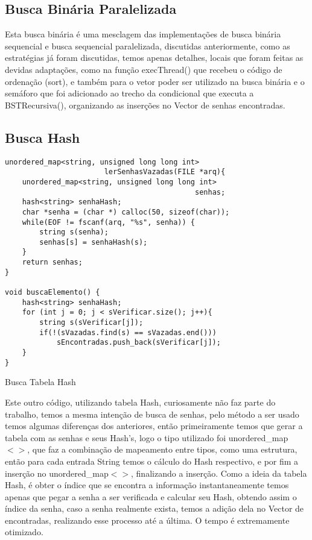 \documentclass[10pt,journal,compsoc]{IEEEtran}
\begin{document}
\subsection{Busca Binária Paralelizada}
	
	Esta busca binária é uma mesclagem das implementações de busca binária sequencial e busca sequencial paralelizada, discutidas anteriormente, como as estratégias já foram discutidas, temos apenas detalhes, locais que foram feitas as devidas adaptações, como na função execThread() que recebeu o código de ordenação (sort), e também para o vetor poder ser utilizado na busca binária e o semáforo que foi adicionado ao trecho da condicional que executa a BSTRecursiva(), organizando as inserções no Vector de senhas encontradas.


\subsection{Busca Hash}
	
\begin{listing}[ht]
\begin{verbatim}
unordered_map<string, unsigned long long int>
                       lerSenhasVazadas(FILE *arq){
    unordered_map<string, unsigned long long int> 
                                            senhas;
    hash<string> senhaHash;
    char *senha = (char *) calloc(50, sizeof(char));
    while(EOF != fscanf(arq, "%s", senha)) {
        string s(senha);
        senhas[s] = senhaHash(s);
    }
    return senhas;
}

void buscaElemento() {
    hash<string> senhaHash;
    for (int j = 0; j < sVerificar.size(); j++){
        string s(sVerificar[j]);
        if(!(sVazadas.find(s) == sVazadas.end()))
            sEncontradas.push_back(sVerificar[j]);
    }
}
\end{verbatim}
\caption{Busca Tabela Hash}
\label{listing:5}
\end{listing}
	
	Este outro código, utilizando tabela Hash, curiosamente não faz parte do trabalho, temos a mesma intenção de busca de senhas, pelo método a ser usado temos algumas diferenças dos anteriores, então primeiramente temos que gerar a tabela com as senhas e seus Hash's, logo o tipo utilizado foi unordered\_map$<>$, que  faz a combinação de mapeamento entre tipos, como uma estrutura, então para cada entrada String temos o cálculo do Hash respectivo, e por fim a inserção no unordered\_map$<>$, finalizando a inserção.
	Como a ideia da tabela Hash, é obter o índice que se encontra a informação instantaneamente temos apenas que pegar a senha a ser verificada e calcular seu Hash, obtendo assim o índice da senha, caso a senha realmente exista, temos a adição dela no Vector de encontradas, realizando esse processo até a última. O tempo é extremamente otimizado. 
	
\end{document}
